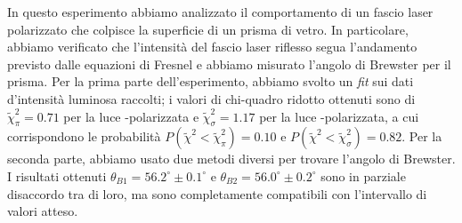 In questo esperimento abbiamo analizzato il comportamento di un fascio laser polarizzato
che colpisce la superficie di un prisma di vetro.
In particolare, abbiamo verificato che l’intensità del fascio laser riflesso segua l’andamento
previsto dalle equazioni di Fresnel e abbiamo misurato l'angolo di Brewster per il prisma.
Per la prima parte dell'esperimento, abbiamo svolto un \emph{fit} sui dati d'intensità luminosa raccolti; i valori di chi-quadro ridotto
ottenuti sono di $\tilde \chi^2_\pi = 0.71$ per la luce \pi-polarizzata e
$\tilde \chi^2_\sigma = 1.17$ per la luce \sigma-polarizzata, a cui corrispondono le probabilità $P(\tilde \chi^2 < \tilde \chi^2_\pi) = 0.10$ e $P(\tilde \chi^2 < \tilde \chi^2_\sigma) = 0.82$.
Per la seconda parte, abbiamo usato due metodi diversi per trovare l'angolo di Brewster.
I risultati ottenuti $\theta_{B1} = 56.2^\circ \pm 0.1^\circ$ e $\theta_{B2} = 56.0^\circ \pm 0.2^\circ$ sono in parziale disaccordo tra di loro,
ma sono completamente compatibili con l'intervallo di valori atteso.
\endinput
